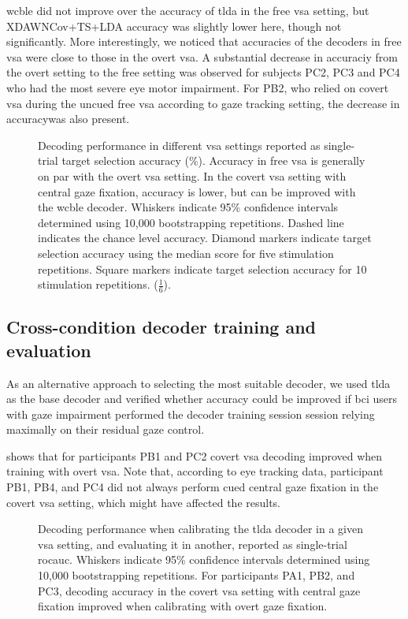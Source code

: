 \documentclass{article}
\begin{document}
\Ac{wcble} did not improve over the accuracy of \ac{tlda} in the free \ac{vsa} setting, but
XDAWNCov+TS+LDA accuracy was slightly lower here, though not
significantly.
More interestingly, we noticed that accuracies of the decoders in free
\ac{vsa} were close to those in the overt \ac{vsa}.
A substantial decrease in accuraciy from the overt setting to the free
setting was observed for subjects PC2, PC3 and PC4 who had the most severe eye
motor impairment.
For PB2, who relied on covert \ac{vsa} during the uncued free \ac{vsa}
according to gaze tracking setting, the decrease in accuracywas also
present.
\begin{figure}
	
	\caption{%
		Decoding performance in different \ac{vsa} settings reported as
		single-trial target selection accuracy (\%).
		Accuracy in free \ac{vsa} is generally on par with the overt \ac{vsa}
		setting.
		In the covert \ac{vsa} setting with central gaze fixation, accuracy is lower, but can
		be improved with the \ac{wcble} decoder.
		Whiskers indicate 95\% confidence intervals determined using 10,000 bootstrapping
		repetitions. Dashed line indicates the chance level accuracy. Diamond
		markers indicate target selection accuracy using the median score for five stimulation
		repetitions. Square markers indicate target selection accuracy for 10
		stimulation repetitions.
		($\frac{1}{6}$).
	}
	\label{fig:patients/decode}
\end{figure}

\subsection{Cross-condition decoder training and evaluation}
\label{sec:patients/outcomes/cross}

As an alternative approach to selecting the most suitable decoder, we used
\ac{tlda} as the base decoder and verified whether accuracy could be improved
if \ac{bci} users with gaze impairment performed the decoder training session
session relying maximally on their residual gaze control.

 shows that for participants PB1 and PC2 covert \ac{vsa} decoding
improved when training with overt \ac{vsa}.
Note that, according to eye tracking data, participant PB1, PB4, and PC4 did not
always perform cued central gaze fixation in the covert \ac{vsa} setting,
which might have affected the results.
\begin{figure}
	
	\caption{
		Decoding performance when calibrating the \ac{tlda} decoder in a given \ac{vsa}
		setting, and evaluating it in another, reported as
		single-trial \ac{rocauc}.
		Whiskers indicate 95\% confidence intervals determined using 10,000 bootstrapping
		repetitions.
		For participants PA1, PB2, and PC3, decoding accuracy in the covert \ac{vsa} setting with central gaze fixation
		improved when calibrating with overt gaze fixation.
	}
	\label{fig:patients/cross}
\end{figure}
\end{document}
